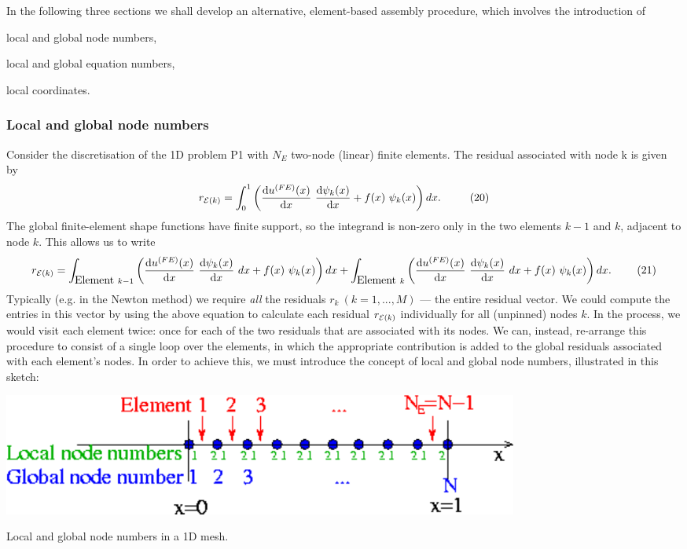 In the following three sections we shall develop an alternative, element-\/based assembly procedure, which involves the introduction of
\begin{DoxyItemize}
\item local and global node numbers,
\item local and global equation numbers,
\item local coordinates.
\end{DoxyItemize}\hypertarget{index_local_global_nodes}{}\subsubsection{Local and global node numbers}\label{index_local_global_nodes}
Consider the discretisation of the 1\-D problem P1 with $N_E$ two-\/node (linear) finite elements. The residual associated with node k is given by \[ r_{{\cal E}(k)} = \int_0^1 \left( \frac{\mbox{d} u^{(FE)}(x)}{\mbox{d} x} \ \frac{\mbox{d} \psi_k(x)}{\mbox{d} x} + f(x) \ \psi_k(x) \right) dx. \ \ \ \ \ \ \ \ (20) \] The global finite-\/element shape functions have finite support, so the integrand is non-\/zero only in the two elements $k-1$ and $k$, adjacent to node $k$. This allows us to write \[ r_{{\cal E}(k)} = \int_{\mbox{Element }k-1} \left( \frac{\mbox{d} u^{(FE)}(x)}{\mbox{d} x} \ \frac{\mbox{d} \psi_k(x)}{\mbox{d} x} \ dx + f(x) \ \psi_k(x) \right) dx + \int_{\mbox{Element }k} \left( \frac{\mbox{d} u^{(FE)}(x)}{\mbox{d} x} \ \frac{\mbox{d} \psi_k(x)}{\mbox{d} x} \ dx + f(x) \ \psi_k(x) \right) dx. \ \ \ \ \ \ \ (21) \] Typically (e.\-g. in the Newton method) we require {\itshape all} the residuals $ r_k \ (k=1,...,M) $ --- the entire residual vector. We could compute the entries in this vector by using the above equation to calculate each residual $ r_{{\cal E}(k)}$ individually for all (unpinned) nodes $k$. In the process, we would visit each element twice\-: once for each of the two residuals that are associated with its nodes. We can, instead, re-\/arrange this procedure to consist of a single loop over the elements, in which the appropriate contribution is added to the global residuals associated with each element's nodes. In order to achieve this, we must introduce the concept of local and global node numbers, illustrated in this sketch\-:  
\begin{DoxyImage}
\includegraphics[width=0.75\textwidth]{1Dmesh_local_and_global_node_numbers}
\caption{Local and global node numbers in a 1\-D mesh. }
\end{DoxyImage}
